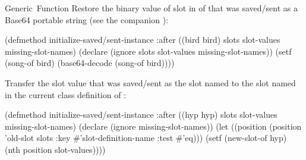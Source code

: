 \documentclass[10pt,twoside,english,pdftex]{article}
\begin{document}
\begin{functiondoc}{Generic~Function}
\fnexamples
\label{ex:song-read}
%
Restore the binary value of slot  in  of
 that was saved/sent as a Base64 portable string (see the companion
):
%
\W\supp
\begin{example}
  (defmethod initialize-saved/sent-instance :after ((bird bird)
                                                    slots slot-values 
                                                    missing-slot-names)
    (declare (ignore slots slot-values missing-slot-names))
    (setf (song-of bird) (base64-decode (song-of bird))))
\end{example}
%
Transfer the slot value that was saved/sent as the slot named 
to the slot named  in the current class definition of
:
%
\W\supp\notpretop
\begin{example}
  (defmethod initialize-saved/sent-instance :after ((hyp hyp)
                                                    slots slot-values 
                                                    missing-slot-names)
    (declare (ignore missing-slot-names))
    (let ((position (position 'old-slot slots 
                              :key #'slot-definition-name
                              :test #'eq)))
       (setf (new-slot-of hyp) (nth position slot-values))))
\end{example}

\end{functiondoc}

\end{document}
